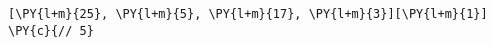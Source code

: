 \begin{Verbatim}[commandchars=\\\{\}]
[\PY{l+m}{25}, \PY{l+m}{5}, \PY{l+m}{17}, \PY{l+m}{3}][\PY{l+m}{1}] \PY{c}{// 5}
\end{Verbatim}
